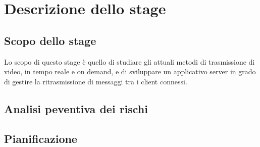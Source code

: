 \chapter{Descrizione dello stage\label{cap:descrizionestage}}
\section{Scopo dello stage}

Lo scopo di questo stage è quello di studiare gli attuali metodi di trasmissione di video, in tempo reale e on demand, e di sviluppare un applicativo server in grado di gestire la ritrasmissione di messaggi tra i client connessi.

\section{Analisi peventiva dei rischi}


\section{Pianificazione}